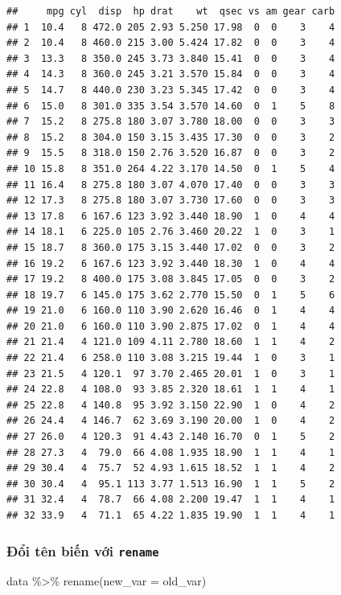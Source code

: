 \documentclass[]{krantz}
\renewenvironment{quote}{\begin{VF}}{\end{VF}}
\theoremstyle{definition}
\theoremstyle{definition}
\theoremstyle{definition}
\theoremstyle{remark}
\begin{document}
\begin{verbatim}
##     mpg cyl  disp  hp drat    wt  qsec vs am gear carb
## 1  10.4   8 472.0 205 2.93 5.250 17.98  0  0    3    4
## 2  10.4   8 460.0 215 3.00 5.424 17.82  0  0    3    4
## 3  13.3   8 350.0 245 3.73 3.840 15.41  0  0    3    4
## 4  14.3   8 360.0 245 3.21 3.570 15.84  0  0    3    4
## 5  14.7   8 440.0 230 3.23 5.345 17.42  0  0    3    4
## 6  15.0   8 301.0 335 3.54 3.570 14.60  0  1    5    8
## 7  15.2   8 275.8 180 3.07 3.780 18.00  0  0    3    3
## 8  15.2   8 304.0 150 3.15 3.435 17.30  0  0    3    2
## 9  15.5   8 318.0 150 2.76 3.520 16.87  0  0    3    2
## 10 15.8   8 351.0 264 4.22 3.170 14.50  0  1    5    4
## 11 16.4   8 275.8 180 3.07 4.070 17.40  0  0    3    3
## 12 17.3   8 275.8 180 3.07 3.730 17.60  0  0    3    3
## 13 17.8   6 167.6 123 3.92 3.440 18.90  1  0    4    4
## 14 18.1   6 225.0 105 2.76 3.460 20.22  1  0    3    1
## 15 18.7   8 360.0 175 3.15 3.440 17.02  0  0    3    2
## 16 19.2   6 167.6 123 3.92 3.440 18.30  1  0    4    4
## 17 19.2   8 400.0 175 3.08 3.845 17.05  0  0    3    2
## 18 19.7   6 145.0 175 3.62 2.770 15.50  0  1    5    6
## 19 21.0   6 160.0 110 3.90 2.620 16.46  0  1    4    4
## 20 21.0   6 160.0 110 3.90 2.875 17.02  0  1    4    4
## 21 21.4   4 121.0 109 4.11 2.780 18.60  1  1    4    2
## 22 21.4   6 258.0 110 3.08 3.215 19.44  1  0    3    1
## 23 21.5   4 120.1  97 3.70 2.465 20.01  1  0    3    1
## 24 22.8   4 108.0  93 3.85 2.320 18.61  1  1    4    1
## 25 22.8   4 140.8  95 3.92 3.150 22.90  1  0    4    2
## 26 24.4   4 146.7  62 3.69 3.190 20.00  1  0    4    2
## 27 26.0   4 120.3  91 4.43 2.140 16.70  0  1    5    2
## 28 27.3   4  79.0  66 4.08 1.935 18.90  1  1    4    1
## 29 30.4   4  75.7  52 4.93 1.615 18.52  1  1    4    2
## 30 30.4   4  95.1 113 3.77 1.513 16.90  1  1    5    2
## 31 32.4   4  78.7  66 4.08 2.200 19.47  1  1    4    1
## 32 33.9   4  71.1  65 4.22 1.835 19.90  1  1    4    1
\end{verbatim}

\hypertarget{i-ten-bin-vi-rename}{%
\subsubsection{\texorpdfstring{Đổi tên biến với
\texttt{rename}}{Đổi tên biến với rename}}\label{i-ten-bin-vi-rename}}

\begin{quote}
data \%\textgreater{}\% rename(new\_var = old\_var)
\end{quote}
\end{document}
